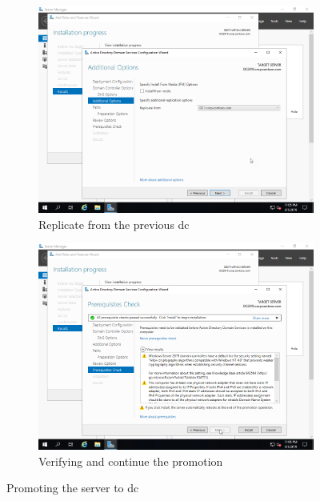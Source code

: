 \begin{figure}[!htb]\ContinuedFloat
	\begin{subfigure}{0.5\textwidth}
		\captionsetup{width=0.8\linewidth}
		\includegraphics[width=0.9\linewidth]{img/Methodologie/Migration21.png}
		\centering
		\caption{Replicate from the previous \acrshort{dc}}
	\end{subfigure}
	\begin{subfigure}{0.5\textwidth}
		\captionsetup{width=0.8\linewidth}
		\includegraphics[width=0.9\linewidth]{img/Methodologie/Migration22.png} 
		\centering	
		\caption{Verifying and continue the promotion}
	\end{subfigure}
	\caption[\acrshort{dc} promotion]{Promoting the server to \acrshort{dc}}
	\label{fig:Promotion}
\end{figure}
\clearpage
